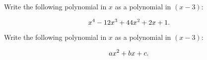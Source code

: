 \documentclass[12pt,letterpaper]{hmcpset}
\newcommand{\pn}[1]{\left( #1 \right)}
\begin{document}
\begin{problem}[20.2.ii]

    Write the following polynomial in $x$ as a polynomial in $\pn{x-3}$:

    \[
        x^4 - 12x^3 + 44x^2 + 2x + 1.\\
    \]

\end{problem}

\begin{solution}

\end{solution}

\begin{problem}[20.2.iv]

    Write the following polynomial in $x$ as a polynomial in $\pn{x-3}$:

    \[
        ax^2 + bx + c.\\
    \]

\end{problem}

\begin{solution}

\end{solution}
\end{document}
